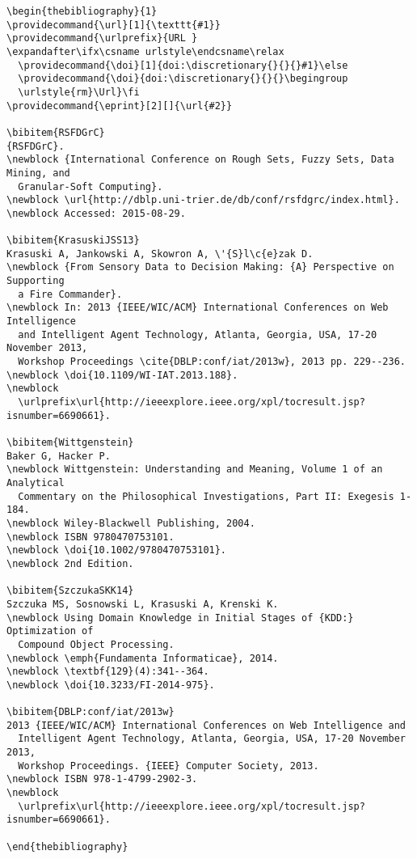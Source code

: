 \documentclass{fundam}
\begin{document}
\begin{small}
\begin{verbatim}
\begin{thebibliography}{1}
\providecommand{\url}[1]{\texttt{#1}}
\providecommand{\urlprefix}{URL }
\expandafter\ifx\csname urlstyle\endcsname\relax
  \providecommand{\doi}[1]{doi:\discretionary{}{}{}#1}\else
  \providecommand{\doi}{doi:\discretionary{}{}{}\begingroup
  \urlstyle{rm}\Url}\fi
\providecommand{\eprint}[2][]{\url{#2}}

\bibitem{RSFDGrC}
{RSFDGrC}.
\newblock {International Conference on Rough Sets, Fuzzy Sets, Data Mining, and
  Granular-Soft Computing}.
\newblock \url{http://dblp.uni-trier.de/db/conf/rsfdgrc/index.html}.
\newblock Accessed: 2015-08-29.

\bibitem{KrasuskiJSS13}
Krasuski A, Jankowski A, Skowron A, \'{S}l\c{e}zak D.
\newblock {From Sensory Data to Decision Making: {A} Perspective on Supporting
  a Fire Commander}.
\newblock In: 2013 {IEEE/WIC/ACM} International Conferences on Web Intelligence
  and Intelligent Agent Technology, Atlanta, Georgia, USA, 17-20 November 2013,
  Workshop Proceedings \cite{DBLP:conf/iat/2013w}, 2013 pp. 229--236.
\newblock \doi{10.1109/WI-IAT.2013.188}.
\newblock
  \urlprefix\url{http://ieeexplore.ieee.org/xpl/tocresult.jsp?isnumber=6690661}.

\bibitem{Wittgenstein}
Baker G, Hacker P.
\newblock Wittgenstein: Understanding and Meaning, Volume 1 of an Analytical
  Commentary on the Philosophical Investigations, Part II: Exegesis 1-184.
\newblock Wiley-Blackwell Publishing, 2004.
\newblock ISBN 9780470753101.
\newblock \doi{10.1002/9780470753101}.
\newblock 2nd Edition.

\bibitem{SzczukaSKK14}
Szczuka MS, Sosnowski L, Krasuski A, Krenski K.
\newblock Using Domain Knowledge in Initial Stages of {KDD:} Optimization of
  Compound Object Processing.
\newblock \emph{Fundamenta Informaticae}, 2014.
\newblock \textbf{129}(4):341--364.
\newblock \doi{10.3233/FI-2014-975}.

\bibitem{DBLP:conf/iat/2013w}
2013 {IEEE/WIC/ACM} International Conferences on Web Intelligence and
  Intelligent Agent Technology, Atlanta, Georgia, USA, 17-20 November 2013,
  Workshop Proceedings. {IEEE} Computer Society, 2013.
\newblock ISBN 978-1-4799-2902-3.
\newblock
  \urlprefix\url{http://ieeexplore.ieee.org/xpl/tocresult.jsp?isnumber=6690661}.

\end{thebibliography}
\end{verbatim}
\end{small}


\nocite{*}



\end{document}
